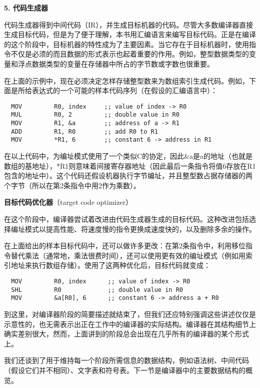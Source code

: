 \documentclass[lang=cn,10pt]{elegantbook}
\begin{document}
\textbf{5. 代码生成器}

代码生成器得到中间代码（IR），并生成目标机器的代码。尽管大多数编译器直接生成目标代码，但是为了便于理解，本书用汇编语言来编写目标代码。正是在编译的这个阶段中，目标机器的特性成为了主要因素。当它存在于目标机器时，使用指令不仅是必须的而且数据的形式表示也起着重要的作用。例如，整型数据类型的变量和浮点数据类型的变量在存储器中所占的字节数或字数也很重要。

在上面的示例中，现在必须决定怎样存储整型数来为数组索引生成代码。例如，下面是所给表达式的一个可能的样本代码序列（在假设的汇编语言中）：

\begin{lstlisting}
  MOV         R0, index     ;; value of index -> R0
  MUL         R0, 2         ;; double value in R0
  MOV         R1, &a        ;; address of a -> R1
  ADD         R1, R0        ;; add R0 to R1
  MOV         *R1, 6        ;; constant 6 -> address in R1
\end{lstlisting}

在以上代码中，为编址模式使用了一个类似C的协定，因此\&a是a的地址（也就是数组的基地址），*R1则意味着间接寄存器地址（因此最后一条指令将值6存放在R1包含的地址中）。这个代码还假设机器执行字节编址，并且整型数占据存储器的两个字节（所以在第2条指令中用2作为乘数）。

\textbf{目标代码优化器}（target code optimizer）

在这个阶段中，编译器尝试着改进由代码生成器生成的目标代码。这种改进包括选择编址模式以提高性能、将速度慢的指令更换成速度快的，以及删除多余的操作。

在上面给出的样本目标代码中，还可以做许多更改：在第2条指令中，利用移位指令替代乘法（通常地，乘法很费时间），还可以使用更有效的编址模式（例如用索引地址来执行数组存储）。使用了这两种优化后，目标代码就变成：

\begin{lstlisting}
  MOV         R0, index      ;; value of index -> R0
  SHL         R0             ;; double value in R0
  MOV         &a[R0], 6      ;; constant 6 -> address a + R0
\end{lstlisting}

到这里，对编译器阶段的简要描述就结束了，但我们还应特别强调这些讲述仅仅是示意性的，也无需表示出正在工作中的编译器的实际结构。编译器在其结构细节上确实差别很大，然而，上面讲到的阶段总会出现在几乎所有的编译器的某个形式上。

我们还谈到了用于维持每一个阶段所需信息的数据结构，例如语法树、中间代码（假设它们并不相同）、文字表和符号表。下一节是编译器中的主要数据结构的概览。
\end{document}
